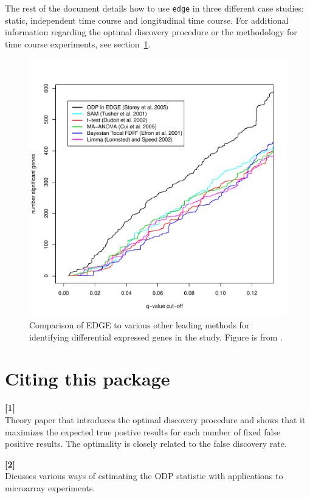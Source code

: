 \documentclass{article}\usepackage[]{graphicx}\usepackage[]{color}
\begin{document}
The rest of the document details how to use {\tt edge} in three different case studies: static, independent time course and longitudinal time course. For additional information regarding the optimal discovery procedure or the \cite{storey:2005} methodology for time course experiments, see section~\ref{sec:citepackage}.

\begin{figure}[t]
 \centering
\includegraphics[scale=.50]{edgecomp.pdf}
\caption{Comparison of EDGE to various other leading methods for identifying differential expressed genes in the \cite{hedenfalk:2001} study. Figure is from \cite{leek2005}.}
\label{fig:Comparison}
\end{figure}


\section{Citing this package}
\label{sec:citepackage}
\textbf{[1] } \\
Theory paper that introduces the optimal discovery procedure and shows that it maximizes the expected true postive results for each number of fixed false positive results. The optimality is closely related to the false discovery rate.

\textbf{[2] } \\
Dicusses various ways of estimating the ODP statistic with applications to microarray experiments.
\end{document}
